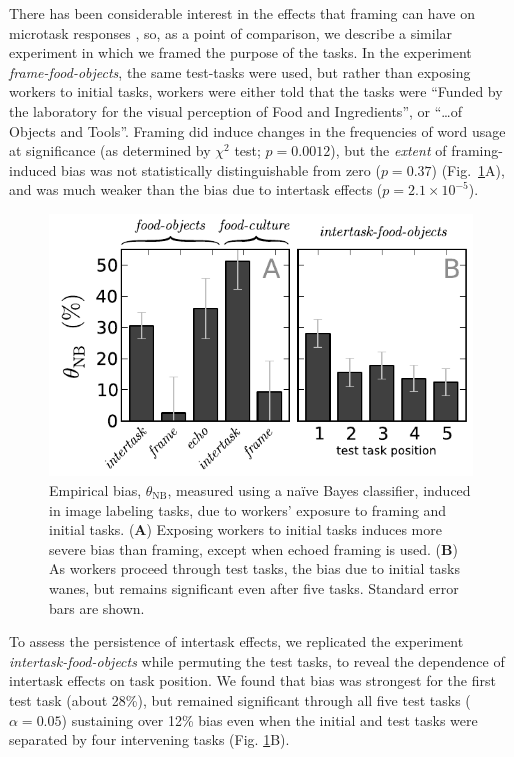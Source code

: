 \documentclass[12pt]{article}
\begin{document}
There has been considerable interest in the effects that framing can have
on microtask responses
\cite{Kinnaird2012281,chandler2013breaking,thibodeau2013natural}, so,
as a point of comparison, we describe a similar experiment 
in which we framed the purpose of the tasks.  In the experiment 
\textit{frame-food-objects}, the same test-tasks were used, but rather
than exposing workers to initial tasks, workers were either told that 
the tasks were ``Funded by the laboratory for the visual perception of Food 
and Ingredients'', or ``\ldots of Objects and Tools''.  
Framing did induce changes in the frequencies of 
word usage at significance (as determined by $\chi^2$ test; $p=0.0012$), but 
the \textit{extent} of framing-induced bias was not statistically 
distinguishable from zero ($p =0.37$) (Fig.~\ref{fig:theta}A), and was
much weaker than the bias due to intertask effects ($p=2.1\times 10^{-5}$).
\begin{figure}
	\centering
	\includegraphics[scale=1]{figs/theta.pdf}
	\caption{
		Empirical bias, $\theta_\mathrm{NB}$, measured using a na\"ive Bayes 
		classifier, induced in image labeling tasks, due to workers' 
		exposure to framing and initial tasks.  
		(\textbf{A}) Exposing workers to initial tasks induces more severe
		bias than framing, except when echoed framing is used. 
		(\textbf{B}) As workers proceed through test tasks, 
		the bias due to initial tasks wanes, 
		but remains significant even after five tasks.  
		Standard error bars are shown.
	}
	\label{fig:theta}
\end{figure}

To assess the persistence of intertask effects, we replicated the experiment
\textit{intertask-food-objects} while permuting the test tasks, to reveal the 
dependence of intertask effects on task position.
We found that bias was strongest for the first test task (about 28\%), 
but remained significant through all five test tasks 
($\alpha=0.05$) sustaining over 12\% bias even when the initial and test 
tasks were separated by four intervening tasks (Fig. \ref{fig:theta}B).
\end{document}
